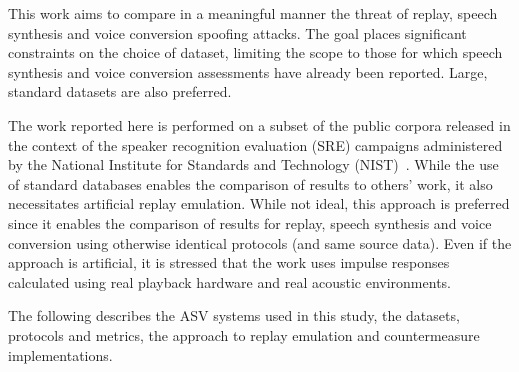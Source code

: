 

This work aims to compare in a meaningful manner the threat of replay, speech synthesis and voice conversion spoofing attacks.  The goal places significant constraints on the choice of dataset, limiting the scope to those for which speech synthesis and voice conversion assessments have already been reported.  Large, standard datasets are also preferred.  

The work reported here is performed on a subset of the public corpora released in the context of the speaker recognition evaluation (SRE) campaigns administered by the National Institute for Standards and Technology (NIST)~\cite{NISTSRE2008}.  While the use of standard databases enables the comparison of results to others' work, it also necessitates artificial replay emulation.  While not ideal, this approach is preferred since it enables the comparison of results for replay, speech synthesis and voice conversion using otherwise identical protocols (and same source data).  Even if the approach is artificial, it is stressed that the work uses impulse responses calculated using real playback hardware and real acoustic environments.



The following describes the ASV systems used in this study, the datasets, protocols and metrics, the approach to replay emulation and countermeasure implementations.
